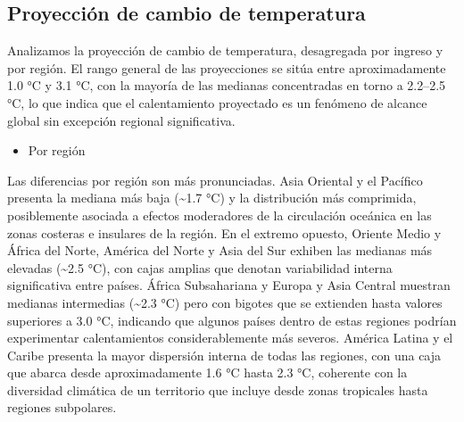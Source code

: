 \documentclass[
]{book}
\providecommand{\tightlist}{%
  \setlength{\itemsep}{0pt}\setlength{\parskip}{0pt}}
\begin{document}
\subsection{Proyección de cambio de temperatura}\label{proyecciuxf3n-de-cambio-de-temperatura}

Analizamos la proyección de cambio de temperatura, desagregada por ingreso y por región. El rango general de las proyecciones se sitúa entre aproximadamente 1.0 °C y 3.1 °C, con la mayoría de las medianas concentradas en torno a 2.2--2.5 °C, lo que indica que el calentamiento proyectado es un fenómeno de alcance global sin excepción regional significativa.

\begin{itemize}
\tightlist
\item
  Por región
\end{itemize}

Las diferencias por región son más pronunciadas. Asia Oriental y el Pacífico presenta la mediana más baja (\textasciitilde1.7 °C) y la distribución más comprimida, posiblemente asociada a efectos moderadores de la circulación oceánica en las zonas costeras e insulares de la región. En el extremo opuesto, Oriente Medio y África del Norte, América del Norte y Asia del Sur exhiben las medianas más elevadas (\textasciitilde2.5 °C), con cajas amplias que denotan variabilidad interna significativa entre países. África Subsahariana y Europa y Asia Central muestran medianas intermedias (\textasciitilde2.3 °C) pero con bigotes que se extienden hasta valores superiores a 3.0 °C, indicando que algunos países dentro de estas regiones podrían experimentar calentamientos considerablemente más severos. América Latina y el Caribe presenta la mayor dispersión interna de todas las regiones, con una caja que abarca desde aproximadamente 1.6 °C hasta 2.3 °C, coherente con la diversidad climática de un territorio que incluye desde zonas tropicales hasta regiones subpolares.
\end{document}
